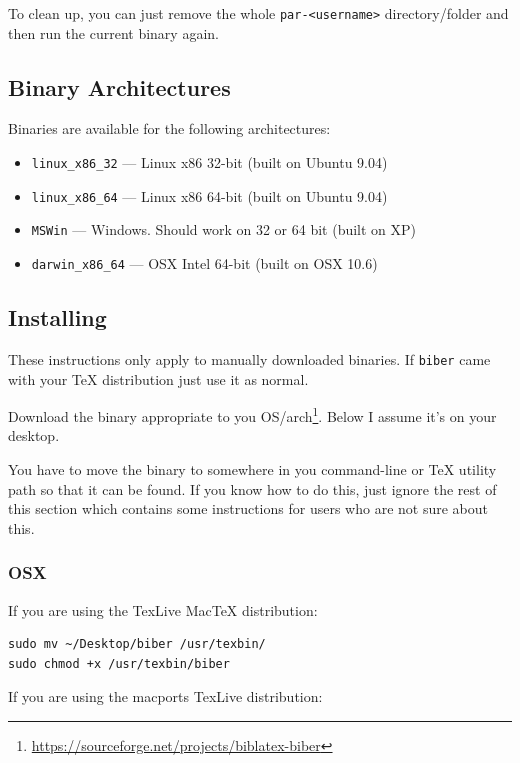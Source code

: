 \documentclass{ltxdockit}
\begin{document}
\noindent To clean up, you can just remove the whole \verb+par-<username>+
directory/folder and then run the current binary again.

\subsection{Binary Architectures}

Binaries are available for the following architectures:

\begin{itemize}
\item \verb+linux_x86_32+ --- Linux x86 32-bit (built on Ubuntu 9.04)
\item \verb+linux_x86_64+ --- Linux x86 64-bit (built on Ubuntu 9.04)
\item \verb+MSWin+ --- Windows. Should work on 32 or 64 bit (built on XP)
\item \verb+darwin_x86_64+ --- OSX Intel 64-bit (built on OSX 10.6)
\end{itemize}

\subsection{Installing}

These instructions only apply to manually downloaded binaries. If
\verb+biber+ came with your TeX distribution just use it as normal.

Download the binary appropriate to you
OS/arch\footnote{\url{https://sourceforge.net/projects/biblatex-biber}}. Below
I assume it's on your desktop.

You have to move the binary to somewhere in you command-line or TeX utility
path so that it can be found. If you know how to do this, just ignore the
rest of this section which contains some instructions for users who are
not sure about this.

\subsubsection{OSX}

If you are using the TexLive MacTeX distribution:

\begin{verbatim}
sudo mv ~/Desktop/biber /usr/texbin/
sudo chmod +x /usr/texbin/biber
\end{verbatim}

\noindent If you are using the macports TexLive distribution:
\end{document}
